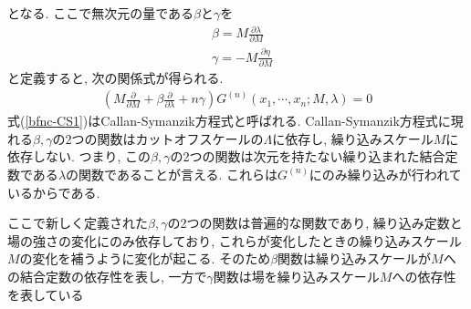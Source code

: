 となる.
ここで無次元の量である$\beta$と$\gamma$を
\begin{align}
  &\beta = M\frac{\partial \lambda}{\partial M} \label{def_beta}\\
  &\gamma =  -M\frac{\partial \eta}{\partial M} \label{def_gamma}
\end{align}
と定義すると, 次の関係式が得られる.
\begin{align}
  \left(M \frac{\partial }{\partial M} + \beta \frac{\partial}{\partial \lambda} + n \gamma\right) G^{(n)}(x_1,\cdots,x_n;M,\lambda) = 0 \label{bfnc-CS1}
\end{align}
式(\ref{bfnc-CS1})はCallan-Symanzik方程式と呼ばれる.
Callan-Symanzik方程式に現れる$\beta, \gamma$の2つの関数はカットオフスケールの$\Lambda$に依存し, 繰り込みスケール$M$に依存しない.
つまり, この$\beta, \gamma$の2つの関数は次元を持たない繰り込まれた結合定数である$\lambda$の関数であることが言える.
これらは$G^{(n)}$にのみ繰り込みが行われているからである.

ここで新しく定義された$\beta, \gamma$の2つの関数は普遍的な関数であり, 繰り込み定数と場の強さの変化にのみ依存しており, これらが変化したときの繰り込みスケール$M$の変化を補うように変化が起こる. 
そのため$\beta$関数は繰り込みスケールが$M$への結合定数の依存性を表し, 一方で$\gamma$関数は場を繰り込みスケール$M$への依存性を表している





